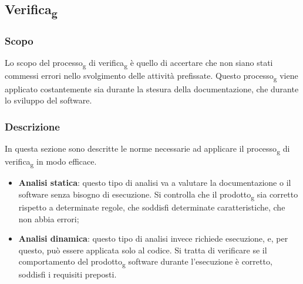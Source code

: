 \subsection{Verifica\textsubscript{g}}
\subsubsection{Scopo}
Lo scopo del processo\textsubscript{g} di verifica\textsubscript{g} è quello di accertare che non siano stati commessi 
errori nello svolgimento delle attività prefissate. Questo processo\textsubscript{g} viene applicato 
costantemente sia durante la stesura della documentazione, che durante lo sviluppo 
del software. 

\subsubsection{Descrizione}
In questa sezione sono descritte le norme necessarie ad applicare il processo\textsubscript{g} di 
verifica\textsubscript{g} in modo efficace.
\begin{itemize}
    \item \textbf{Analisi statica}: questo tipo di analisi va a valutare la 
    documentazione o il software senza bisogno di esecuzione. Si controlla che il 
    prodotto\textsubscript{g} sia corretto rispetto a determinate regole, che soddisfi determinate 
    caratteristiche, che non abbia errori;
    \item \textbf{Analisi dinamica}: questo tipo di analisi invece richiede esecuzione, e, per 
    questo, può essere applicata solo al codice. Si tratta di verificare se il comportamento del 
    prodotto\textsubscript{g} software durante l’esecuzione è corretto, soddisfi i requisiti preposti.
\end{itemize} 


